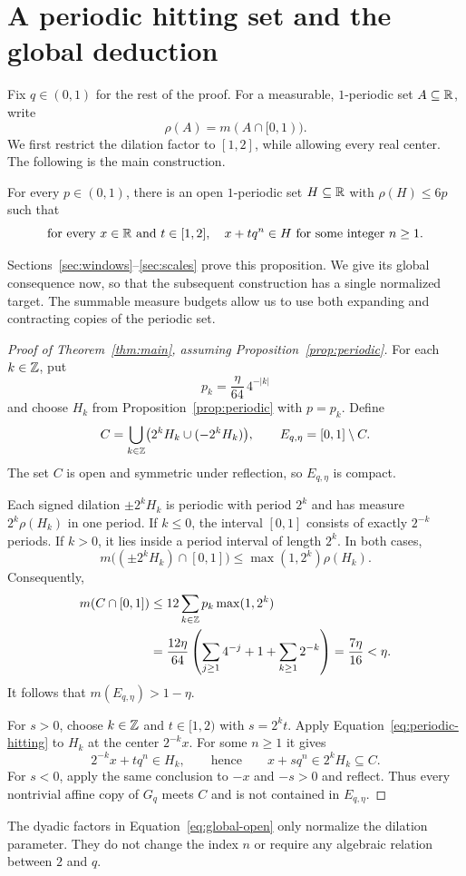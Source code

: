 \section{A periodic hitting set and the global deduction}
\label{sec:periodic}

Fix $q\in(0,1)$ for the rest of the proof. For a measurable,
$1$-periodic set $A\subseteq\mathbb R$, write
\[
 \rho(A)=m(A\cap[0,1)).
\]
We first restrict the dilation factor to $[1,2]$, while allowing every
real center. The following is the main construction.

\begin{proposition}\label{prop:periodic}
For every $p\in(0,1)$, there is an open $1$-periodic set $H\subseteq\mathbb R$
with $\rho(H)\le6p$ such that
\begin{equation}\label{eq:periodic-hitting}
 \text{for every }x\in\mathbb R\text{ and }t\in[1,2],
 \quad x+tq^n\in H\text{ for some integer }n\ge1.
\end{equation}
\end{proposition}

Sections~\ref{sec:windows}--\ref{sec:scales} prove this proposition.
We give its global consequence now, so that the subsequent construction
has a single normalized target. The summable measure budgets allow us
to use both expanding and contracting copies of the periodic set.

\begin{proof}[Proof of Theorem~\ref{thm:main}, assuming
Proposition~\ref{prop:periodic}]
For each $k\in\mathbb Z$, put
\[
 p_k=\frac{\eta}{64}\,4^{-|k|}
\]
and choose $H_k$ from Proposition~\ref{prop:periodic} with $p=p_k$.
Define
\begin{equation}\label{eq:global-open}
 C=\bigcup_{k\in\mathbb Z}\bigl(2^kH_k\cup(-2^kH_k)\bigr),
 \qquad E_{q,\eta}=[0,1]\setminus C.
\end{equation}
The set $C$ is open and symmetric under reflection, so $E_{q,\eta}$
is compact.

Each signed dilation $\pm2^kH_k$ is periodic with period $2^k$ and
has measure $2^k\rho(H_k)$ in one period. If $k\le0$, the interval
$[0,1]$ consists of exactly $2^{-k}$ periods. If $k>0$, it lies inside
a period interval of length $2^k$. In both cases,
\[
 m\bigl((\pm2^kH_k)\cap[0,1]\bigr)
 \le \max(1,2^k)\rho(H_k).
\]
Consequently,
\begin{align}
 m(C\cap[0,1])
 &\le12\sum_{k\in\mathbb Z}p_k\max(1,2^k)\notag\\
 &=\frac{12\eta}{64}
   \left(\sum_{j\ge1}4^{-j}+1+\sum_{k\ge1}2^{-k}\right)
 =\frac{7\eta}{16}<\eta.
 \label{eq:global-measure}
\end{align}
It follows that $m(E_{q,\eta})>1-\eta$.

For $s>0$, choose $k\in\mathbb Z$ and $t\in[1,2)$ with $s=2^kt$.
Apply Equation~\eqref{eq:periodic-hitting} to $H_k$ at the center
$2^{-k}x$. For some $n\ge1$ it gives
\[
 2^{-k}x+tq^n\in H_k,
 \qquad\text{hence}\qquad x+sq^n\in2^kH_k\subseteq C.
\]
For $s<0$, apply the same conclusion to $-x$ and $-s>0$ and reflect.
Thus every nontrivial affine copy of $G_q$ meets $C$ and is not
contained in $E_{q,\eta}$.
\end{proof}

The dyadic factors in Equation~\eqref{eq:global-open} only normalize
the dilation parameter. They do not change the index $n$ or require
any algebraic relation between $2$ and $q$.
